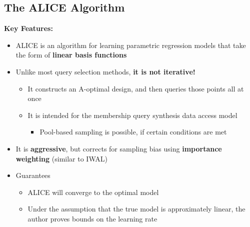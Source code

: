 \documentclass[10pt]{article}
\begin{document}
\subsection*{The ALICE Algorithm}
\textbf{Key Features:}
\begin{itemize}
	\item ALICE is an algorithm for learning parametric regression models that take the form of \textbf{linear basis functions}
	\item Unlike most query selection methods, \textbf{it is not iterative!}
	\begin{itemize}
	    \item It constructs an A-optimal design, and then queries those points all at once
	    \item It is intended for the membership query synthesis data access model
	    \begin{itemize}
	        \item Pool-based sampling is possible, if certain conditions are met
        \end{itemize}
    \end{itemize}
    \item It is \textbf{aggressive}, but corrects for sampling bias using \textbf{importance weighting} (similar to IWAL)
    \item Guarantees
    \begin{itemize}
	    \item ALICE will converge to the optimal model
	    \item Under the assumption that the true model is approximately linear, the author proves bounds on the learning rate
    \end{itemize}    
\end{itemize}
\end{document}
